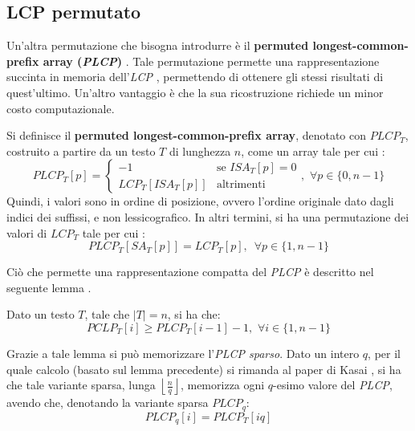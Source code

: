 \subsection{LCP permutato}
Un'altra permutazione che bisogna introdurre è il \textbf{permuted
  longest-common-prefix array (\textit{PLCP})} \cite{plcp}.
Tale permutazione
permette una rappresentazione succinta in memoria dell'\textit{LCP}
\cite{plcp2},
permettendo di ottenere gli stessi risultati di quest'ultimo. Un'altro vantaggio
è che la sua ricostruzione richiede un minor costo computazionale.
\begin{definizione}
  Si definisce il \textbf{permuted longest-common-prefix array}, denotato con
  $PLCP_T$, costruito a partire da un testo $T$ di lunghezza $n$, come un
  array tale per cui \cite{phoni}:
  \[PLCP_T[p]=
    \begin{cases}
      -1&\mbox{se }ISA_T[p]=0\\
      LCP_T[ISA_T[p]]&\mbox{altrimenti}
    \end{cases},\,\,\forall p\in\{0,n-1\}
  \]
  Quindi, i valori sono in ordine di posizione, ovvero l'ordine originale dato
  dagli indici dei suffissi, e non
  lessicografico. In altri termini, si ha una permutazione dei valori di $LCP_T$
  tale per cui \cite{plcp}:
  \[PLCP_T[SA_T[p]] = LCP_T[p],\,\,\,\forall p\in\{1,n-1\}\]
\end{definizione}
Ciò che permette una rappresentazione compatta del \textit{PLCP} è descritto nel
seguente lemma \cite{plcp3}.
\begin{lemma}
  Dato un testo $T$, tale che $|T|=n$, si ha che:
  \[PCLP_T[i]\geq PLCP_T[i-1]-1,\,\,\forall i\in\{1,n-1\}\]
\end{lemma}
Grazie a tale lemma si può memorizzare l'\textit{PLCP sparso}. Dato un intero
$q$, per il quale calcolo (basato sul lemma precedente) si rimanda al paper di
Kasai \cite{plcp3}, si ha che 
tale variante sparsa, lunga $\left\lfloor\frac{n}{q}\right\rfloor$, memorizza
ogni $q$-esimo valore del \textit{PLCP}, avendo che, denotando la variante
sparsa $PLCP_q$:
\[PLCP_q[i]=PLCP_T[iq]\]
